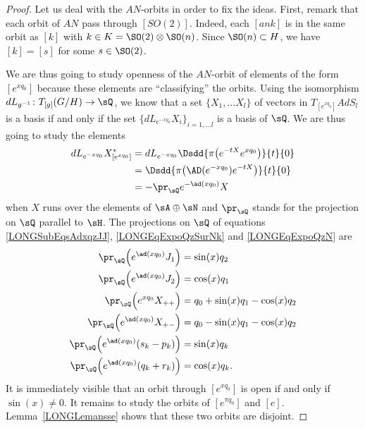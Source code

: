 \begin{proof}
	Let us deal with the $AN$-orbits in order to fix the ideas. First, remark that each orbit of $AN$ pass through $[SO(2)]$. Indeed, each $[ank]$ is in the same orbit as $[k]$ with $k\in K=\SO(2)\otimes\SO(n)$. Since $\SO(n)\subset H$, we have $[k]=[s]$ for some $s\in\SO(2)$.

	We are thus going to study openness of the $AN$-orbit of elements of the form $[e^{x q_0}]$ because these elements are ``classifying'' the orbits. Using the isomorphism $  dL_{g^{-1}}\colon T_{[g]}(G/H)\to \sQ$, we know that a set $\{ X_1,\ldots X_l \}$ of vectors in $T_{[ e^{x q_0}]}AdS_l$ is a basis if and only if the set $\{ dL_{ e^{-xq_0}}X_i \}_{i=1,\ldots l}$ is a basis of $\sQ$. We are thus going to study the elements
	\begin{equation}
		\begin{aligned}[]
			dL_{ e^{-xq_0}}X^*_{[ e^{xq_0}]} & =dL_{ e^{-xq_0}}\Dsdd{ \pi\big(  e^{-t X} e^{xq_0} \big) }{t}{0} \\
			                                 & =\Dsdd{ \pi\big(  \AD( e^{-xq_0} ) e^{-tX} \big) }{t}{0}         \\
			                                 & =-\pr_{\sQ} e^{-\ad(xq_0)}X
		\end{aligned}
	\end{equation}
	when $X$ runs over the elements of $\sA\oplus \sN$ and $\pr_{\sQ}$ stands for the projection on $\sQ$ parallel to $\sH$.
	The projections on $\sQ$ of equations \eqref{LONGSubEqsAdxqzJJ}, \eqref{LONGEqExpoQzSurNk} and \eqref{LONGEqExpoQzN} are
	\begin{subequations}        \label{LONGSubEqsExpAdxqDivers}
		\begin{align}
			\pr_{\sQ}\Big( e^{\ad(xq_0)}J_1\Big)         & =\sin(x)q_2                \\
			\pr_{\sQ}\Big( e^{\ad(xq_0)}J_2\Big)         & =\cos(x)q_1                \\
			\pr_{\sQ}\Big(  e^{xq_0}X_{++} \Big)         & =q_0+\sin(x)q_1-\cos(x)q_2 \\
			\pr_{\sQ} \Big(   e^{\ad(xq_0)}X_{+-} \Big)  & =q_0-\sin(x)q_1-\cos(x)q_2 \\
			\pr_{\sQ}\Big(  e^{\ad(xq_0)}(s_k-p_k) \Big) & = \sin(x)q_k               \\
			\pr_{\sQ}\Big(  e^{\ad(xq_0)}(q_k+r_k) \Big) & =\cos(x)q_k.
		\end{align}
	\end{subequations}
	It is immediately visible
	that an orbit through $[ e^{xq_0}]$ is open if and only if $\sin(x)\neq 0$. It remains to study the orbits of $[ e^{\pi q_0}]$ and $[e]$. Lemma~\ref{LONGLemansse} shows that these two orbits are disjoint.


\end{proof}
